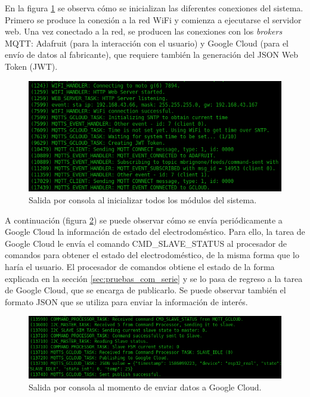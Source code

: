 En la figura \ref{fig:output_init} se observa cómo se inicializan las diferentes conexiones del sistema. Primero se produce la conexión a la red WiFi y comienza a ejecutarse el servidor web. Una vez conectado a la red, se producen las conexiones con los \emph{brokers} MQTT: Adafruit (para la interacción con el usuario) y Google Cloud (para el envío de datos al fabricante), que requiere también la generación del JSON Web Token (JWT).

\begin{figure}[h]
\centering
\includegraphics[width=\textwidth]{./Figures/output_init.png}
\caption{Salida por consola al inicializar todos los módulos del sistema.}
\label{fig:output_init}
\end{figure}

A continuación (figura \ref{fig:output_gcloud_mqtt}) se puede observar cómo se envía periódicamente a Google Cloud la información de estado del electrodoméstico. Para ello, la tarea de Google Cloud le envía el comando CMD\_SLAVE\_STATUS al procesador de comandos para obtener el estado del electrodoméstico, de la misma forma que lo haría el usuario. El procesador de comandos obtiene el estado de la forma explicada en la sección \ref{sec:pruebas_com_serie} y se lo pasa de regreso a la tarea de Google Cloud, que se encarga de publicarlo. Se puede observar también el formato JSON que se utiliza para enviar la información de interés.

\begin{figure}[h]
\centering
\includegraphics[width=\textwidth]{./Figures/output_gcloud_mqtt_json.png}
\caption{Salida por consola al momento de enviar datos a Google Cloud.}
\label{fig:output_gcloud_mqtt}
\end{figure}

